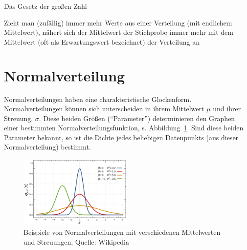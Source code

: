 \documentclass[
  a4paper,
  DIV=11]{scrreprt}
\theoremstyle{definition}
\theoremstyle{remark}
\begin{document}
\begin{tcolorbox}[enhanced jigsaw, title=\textcolor{quarto-callout-important-color}{\faExclamation}\hspace{0.5em}{Wichtig}, bottomtitle=1mm, bottomrule=.15mm, titlerule=0mm, colbacktitle=quarto-callout-important-color!10!white, colframe=quarto-callout-important-color-frame, leftrule=.75mm, left=2mm, toprule=.15mm, colback=white, arc=.35mm, breakable, toptitle=1mm, opacityback=0, rightrule=.15mm, coltitle=black, opacitybacktitle=0.6]

Das Gesetz der großen Zahl

Zieht man (zufällig) immer mehr Werte aus einer Verteilung (mit
endlichem Mittelwert), nähert sich der Mittelwert der Stichprobe immer
mehr mit dem Mittelwert (oft als Erwartungswert bezeichnet) der
Verteilung an

\end{tcolorbox}

\hypertarget{normalverteilung}{%
\section{Normalverteilung}\label{normalverteilung}}

Normalverteilungen haben eine charakteristische Glockenform.
Normalverteilungen können sich unterscheiden in ihrem Mittelwert \(\mu\)
und ihrer Streuung, \(\sigma\). Diese beiden Größen (``Parameter'')
determinieren den Graphen einer bestimmten Normalverteilungsfunktion, s.
Abbildung~\ref{fig-norms}. Sind diese beiden Parameter bekannt, so ist
die Dichte jedes beliebigen Datenpunkts (aus dieser Normalverteilung)
bestimmt.

\begin{figure}

{\centering \includegraphics[width=0.5\textwidth,height=\textheight]{./img/normals.png}

}

\caption{\label{fig-norms}Beispiele von Normalverteilungen mit
verschiedenen Mittelwerten und Streuungen, Quelle: Wikipedia}

\end{figure}
\end{document}
